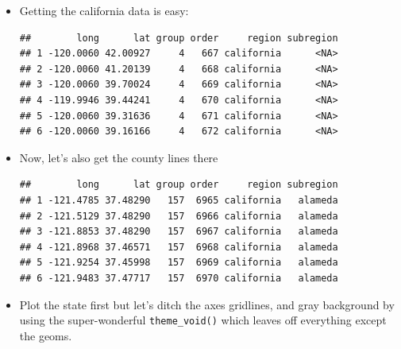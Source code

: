 \documentclass[]{book}
\newenvironment{Shaded}{\begin{snugshade}}{\end{snugshade}}
\newcommand{\KeywordTok}[1]{\textcolor[rgb]{0.13,0.29,0.53}{\textbf{{#1}}}}
\newcommand{\StringTok}[1]{\textcolor[rgb]{0.31,0.60,0.02}{{#1}}}
\newcommand{\NormalTok}[1]{{#1}}
\theoremstyle{definition}
\theoremstyle{definition}
\theoremstyle{remark}
\begin{document}
\begin{itemize}
\item
  Getting the california data is easy:

\begin{Shaded}
\end{Shaded}

\begin{verbatim}
##        long      lat group order     region subregion
## 1 -120.0060 42.00927     4   667 california      <NA>
## 2 -120.0060 41.20139     4   668 california      <NA>
## 3 -120.0060 39.70024     4   669 california      <NA>
## 4 -119.9946 39.44241     4   670 california      <NA>
## 5 -120.0060 39.31636     4   671 california      <NA>
## 6 -120.0060 39.16166     4   672 california      <NA>
\end{verbatim}
\item
  Now, let's also get the county lines there

\begin{Shaded}
\end{Shaded}

\begin{verbatim}
##        long      lat group order     region subregion
## 1 -121.4785 37.48290   157  6965 california   alameda
## 2 -121.5129 37.48290   157  6966 california   alameda
## 3 -121.8853 37.48290   157  6967 california   alameda
## 4 -121.8968 37.46571   157  6968 california   alameda
## 5 -121.9254 37.45998   157  6969 california   alameda
## 6 -121.9483 37.47717   157  6970 california   alameda
\end{verbatim}
\item
  Plot the state first but let's ditch the axes gridlines, and gray
  background by using the super-wonderful \texttt{theme\_void()} which
  leaves off everything except the geoms.


\end{itemize}
\end{document}
